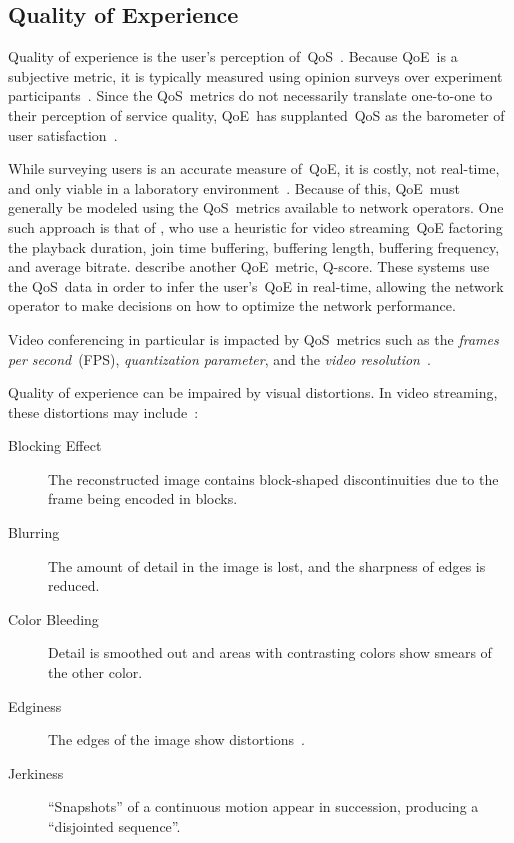 
    \subsection{Quality of Experience}\label{introduction:qoe}
        Quality of experience is the user's perception of~QoS~\autocite{ChenYanjiao2015FQtQ}. Because QoE~is a subjective metric, it is typically measured using opinion surveys over experiment participants~\autocite{ChenYanjiao2015FQtQ,RodrriguezDemóstenesZ2014Vqai}. Since the QoS~metrics do not necessarily translate one-to-one to their perception of service quality, QoE~has supplanted~QoS as the barometer of user satisfaction~\autocite{DinakiHosseinEbrahimi2021FVQW}.

        While surveying users is an accurate measure of~QoE, it is costly, not real-time, and only viable in a laboratory environment~\autocite{ChenYanjiao2015FQtQ,SongHan2011Qpsq}. Because of this, QoE~must generally be modeled using the QoS~metrics available to network operators. One such approach is that of \textcite{DinakiHosseinEbrahimi2021FVQW}, who use a heuristic for video streaming~QoE factoring the playback duration, join time buffering, buffering length, buffering frequency, and average bitrate. \Textcite{SongHan2011Qpsq} describe another QoE~metric, Q-score. These systems use the QoS~data in order to infer the user's~QoE in real-time, allowing the network operator to make decisions on how to optimize the network performance.

        Video conferencing in particular is impacted by QoS~metrics such as the \emph{frames per second}~(FPS), \emph{quantization parameter}, and the \emph{video resolution}~\autocite{MacMillanKyle2021MtPa}.

        Quality of experience can be impaired by visual distortions. In video streaming, these distortions may include~\autocite{YuenMichael1998Asoh}:
        \begin{description}
            \item[Blocking Effect] The reconstructed image contains block-shaped discontinuities due to the frame being encoded in blocks.
            \item[Blurring] The amount of detail in the image is lost, and the sharpness of edges is reduced.
            \item[Color Bleeding] Detail is smoothed out and areas with contrasting colors show smears of the other color.
            \item[Edginess] The edges of the image show distortions~\autocite{ChenYanjiao2015FQtQ}.
            \item[Jerkiness] \enquote{Snapshots} of a continuous motion appear in succession, producing a \enquote{disjointed sequence}.
        \end{description}

